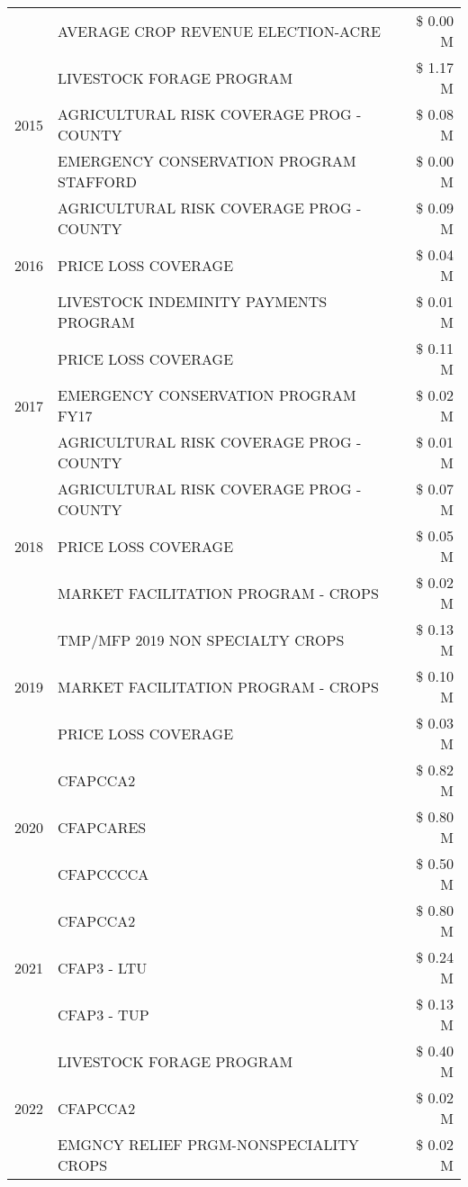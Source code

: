 \begin{tabular}{llr}
 & AVERAGE CROP REVENUE ELECTION-ACRE & \$ 0.00 M \\
\cline{1-3}
\multirow[t]{3}{*}{2015} & LIVESTOCK FORAGE PROGRAM & \$ 1.17 M \\
 & AGRICULTURAL RISK COVERAGE PROG - COUNTY & \$ 0.08 M \\
 & EMERGENCY CONSERVATION PROGRAM STAFFORD & \$ 0.00 M \\
\cline{1-3}
\multirow[t]{3}{*}{2016} & AGRICULTURAL RISK COVERAGE PROG - COUNTY & \$ 0.09 M \\
 & PRICE LOSS COVERAGE & \$ 0.04 M \\
 & LIVESTOCK INDEMINITY PAYMENTS PROGRAM & \$ 0.01 M \\
\cline{1-3}
\multirow[t]{3}{*}{2017} & PRICE LOSS COVERAGE & \$ 0.11 M \\
 & EMERGENCY CONSERVATION PROGRAM FY17 & \$ 0.02 M \\
 & AGRICULTURAL RISK COVERAGE PROG - COUNTY & \$ 0.01 M \\
\cline{1-3}
\multirow[t]{3}{*}{2018} & AGRICULTURAL RISK COVERAGE PROG - COUNTY & \$ 0.07 M \\
 & PRICE LOSS COVERAGE & \$ 0.05 M \\
 & MARKET FACILITATION PROGRAM - CROPS & \$ 0.02 M \\
\cline{1-3}
\multirow[t]{3}{*}{2019} & TMP/MFP 2019 NON SPECIALTY CROPS & \$ 0.13 M \\
 & MARKET FACILITATION PROGRAM - CROPS & \$ 0.10 M \\
 & PRICE LOSS COVERAGE & \$ 0.03 M \\
\cline{1-3}
\multirow[t]{3}{*}{2020} & CFAPCCA2 & \$ 0.82 M \\
 & CFAPCARES & \$ 0.80 M \\
 & CFAPCCCCA & \$ 0.50 M \\
\cline{1-3}
\multirow[t]{3}{*}{2021} & CFAPCCA2 & \$ 0.80 M \\
 & CFAP3 - LTU & \$ 0.24 M \\
 & CFAP3 - TUP & \$ 0.13 M \\
\cline{1-3}
\multirow[t]{3}{*}{2022} & LIVESTOCK FORAGE PROGRAM & \$ 0.40 M \\
 & CFAPCCA2 & \$ 0.02 M \\
 & EMGNCY RELIEF PRGM-NONSPECIALITY CROPS & \$ 0.02 M \\
\cline{1-3}
\bottomrule
\end{tabular}
